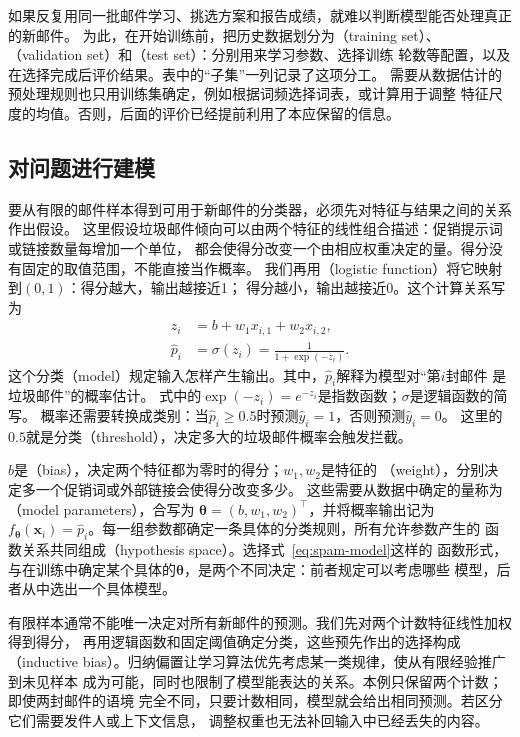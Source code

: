 如果反复用同一批邮件学习、挑选方案和报告成绩，就难以判断模型能否处理真正的新邮件。
为此，在开始训练前，把历史数据划分为（training set）、
（validation set）和（test set）：分别用来学习参数、选择训练
轮数等配置，以及在选择完成后评价结果。表中的“子集”一列记录了这项分工。
需要从数据估计的预处理规则也只用训练集确定，例如根据词频选择词表，或计算用于调整
特征尺度的均值。否则，后面的评价已经提前利用了本应保留的信息。

\subsection{对问题进行建模}

要从有限的邮件样本得到可用于新邮件的分类器，必须先对特征与结果之间的关系作出假设。
这里假设垃圾邮件倾向可以由两个特征的线性组合描述：促销提示词或链接数量每增加一个单位，
都会使得分改变一个由相应权重决定的量。得分没有固定的取值范围，不能直接当作概率。
我们再用（logistic function）将它映射到$(0,1)$：得分越大，输出越接近1；
得分越小，输出越接近0。这个计算关系写为
\begin{align}
  z_i &= b+w_1x_{i,1}+w_2x_{i,2}, \\
  \hat{p}_i &= \sigma(z_i)=\frac{1}{1+\exp(-z_i)}.
  \label{eq:spam-model}
\end{align}
这个分类（model）规定输入怎样产生输出。其中，$\hat{p}_i$解释为模型对“第$i$封邮件
是垃圾邮件”的概率估计。
式中的$\exp(-z_i)=e^{-z_i}$是指数函数；$\sigma$是逻辑函数的简写。
概率还需要转换成类别：当$\hat{p}_i\geq 0.5$时预测$\hat{y}_i=1$，否则预测$\hat{y}_i=0$。
这里的$0.5$就是分类（threshold），决定多大的垃圾邮件概率会触发拦截。

$b$是（bias），决定两个特征都为零时的得分；$w_1,w_2$是特征的
（weight），分别决定多一个促销词或外部链接会使得分改变多少。
这些需要从数据中确定的量称为（model parameters），合写为
$\bm{\theta}=(b,w_1,w_2)^{\top}$，并将概率输出记为
$f_{\bm{\theta}}(\bm{x}_i)=\hat{p}_i$。每一组参数都确定一条具体的分类规则，所有允许参数产生的
函数关系共同组成（hypothesis space）。选择式~\eqref{eq:spam-model}这样的
函数形式，与在训练中确定某个具体的$\bm{\theta}$，是两个不同决定：前者规定可以考虑哪些
模型，后者从中选出一个具体模型。

有限样本通常不能唯一决定对所有新邮件的预测。我们先对两个计数特征线性加权得到得分，
再用逻辑函数和固定阈值确定分类，这些预先作出的选择构成
（inductive bias）。归纳偏置让学习算法优先考虑某一类规律，使从有限经验推广到未见样本
成为可能，同时也限制了模型能表达的关系。本例只保留两个计数；即使两封邮件的语境
完全不同，只要计数相同，模型就会给出相同预测。若区分它们需要发件人或上下文信息，
调整权重也无法补回输入中已经丢失的内容。

